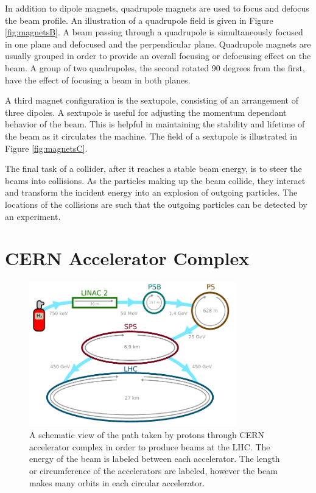 In addition to dipole magnets, quadrupole magnets are used to focus and defocus the beam profile.
An illustration of a quadrupole field is given in Figure \ref{fig:magnetsB}.
A beam passing through a quadrupole is simultaneously focused in one plane and defocused and the perpendicular plane.
Quadrupole magnets are usually grouped in order to provide an overall focusing or defocusing effect on the beam.
A group of two quadrupoles, the second rotated 90 degrees from the first, have the effect of focusing a beam in both planes.

A third magnet configuration is the sextupole, consisting of an arrangement of three dipoles.
A sextupole is useful for adjusting the momentum dependant behavior of the beam. 
This is helpful in maintaining the stability and lifetime of the beam as it circulates the machine.
The field of a sextupole is illustrated in Figure \ref{fig:magnetsC}.

The final task of a collider, after it reaches a stable beam energy, is to steer the beams into collisions.
As the particles making up the beam collide, they interact and transform the incident energy into an explosion of outgoing particles.
The locations of the collisions are such that the outgoing particles can be detected by an experiment.

\section{CERN Accelerator Complex}

\begin{figure}[h!]
\captionsetup[subfigure]{position=b}
\centering
\includegraphics[width=0.8\textwidth]{figures/experiment/cernAccelChain.pdf}
\caption{A schematic view of the path taken by protons through CERN accelerator complex in order to produce beams at the LHC. The energy of the beam is labeled between each accelerator. The length or circumference of the accelerators are labeled, however the beam makes many orbits in each circular accelerator.}
\label{fig:accelComplex}
\end{figure}

